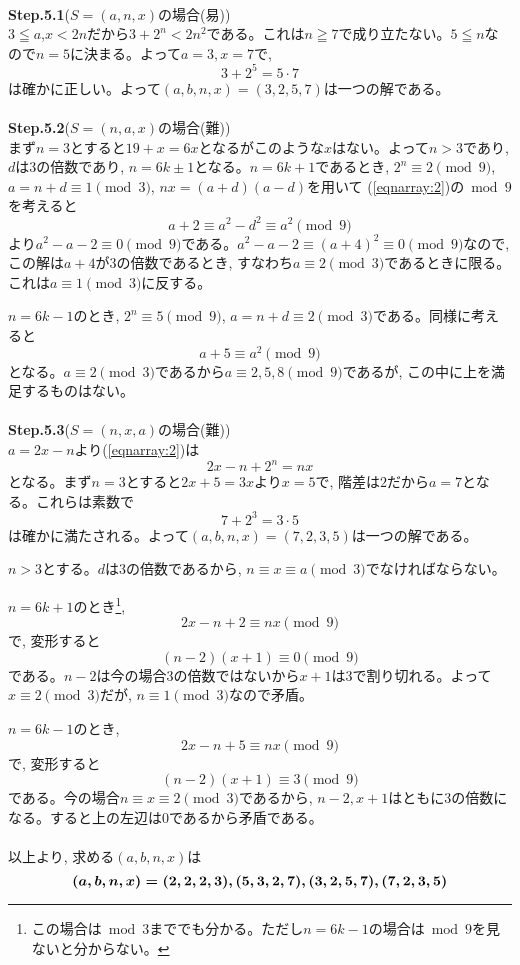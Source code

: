 \documentclass[twocolumn]{jbook}
\newcommand{\bolm}[1]{{\mbox{\boldmath $#1$}}}
\renewcommand{\leq}{\leqq}
\renewcommand{\geq}{\geqq}
\newcommand{\step}[2]{{\Large \textbf{Step.#1}}(#2)}
\begin{document}
\\
\step{5.1}{$S=(a,n,x)$の場合(易)}\\
$3\leq a$,$x<2n$だから$3+2^{n} < 2n^2$である。これは$n\geq 7$で成り立たない。$5\leq n$なので$n=5$に決まる。よって$a=3,x=7$で, 
\[3+2^{5} = 5\cdot 7\]
は確かに正しい。よって$(a,b,n,x) = (3,2,5,7)$は一つの解である。\\
\\
\step{5.2}{$S=(n,a,x)$の場合(難)}\\
まず$n=3$とすると$19+x = 6x$となるがこのような$x$はない。よって$n>3$であり, $d$は3の倍数であり, $n=6k\pm 1$となる。$n=6k+1$であるとき, $2^{n} \equiv 2\pmod{9}$, $a = n+d \equiv 1\pmod{3}$, $nx = (a+d)(a-d)$を用いて (\ref{eqnarray:2})の$\bmod{9}$を考えると
\[a+2 \equiv a^2 - d^2 \equiv a^2 \pmod{9}  \]
より$a^2 - a-2\equiv 0 \pmod{9}$である。$a^2 - a-2\equiv (a+4)^2 \equiv 0\pmod{9}$なので, この解は$a+4$が3の倍数であるとき, すなわち$a\equiv 2\pmod{3}$であるときに限る。これは$a\equiv 1\pmod{3}$に反する。\par
$n=6k-1$のとき, $2^{n} \equiv 5\pmod{9}$, $a = n+d\equiv 2\pmod{3}$である。同様に考えると
\[a+5\equiv a^2 \pmod{9}\]
となる。$a\equiv 2\pmod{3}$であるから$a\equiv 2,5,8\pmod{9}$であるが, この中に上を満足するものはない。\\
\\
\step{5.3}{$S=(n,x,a)$の場合(難)}\\
$a=2x - n$より(\ref{eqnarray:2})は
\[2x - n + 2^{n} = nx\]
となる。まず$n=3$とすると$2x + 5 = 3x$より$x=5$で, 階差は$2$だから$a=7$となる。これらは素数で
\[7 + 2^{3} = 3\cdot 5\]
は確かに満たされる。よって$(a,b,n,x) = (7,2,3,5)$は一つの解である。\par
$n>3$とする。$d$は$3$の倍数であるから, $n\equiv x \equiv a \pmod{3}$でなければならない。\par
$n=6k+1$のとき\footnote{この場合は$\bmod{3}$まででも分かる。ただし$n=6k-1$の場合は$\bmod{9}$を見ないと分からない。}, 
\[2x - n + 2 \equiv nx \pmod{9}\]
で, 変形すると
\[(n-2)(x+1)\equiv 0 \pmod{9}\]
である。$n-2$は今の場合$3$の倍数ではないから$x+1$は$3$で割り切れる。よって$x\equiv 2\pmod{3}$だが, $n\equiv 1\pmod{3}$なので矛盾。\par
$n=6k-1$のとき, 
\[2x - n + 5 \equiv nx \pmod{9}\]
で, 変形すると
\[(n-2)(x+1) \equiv 3\pmod{9}\]
である。今の場合$n\equiv x\equiv 2\pmod{3}$であるから, $n-2, x+1$はともに3の倍数になる。すると上の左辺は$0$であるから矛盾である。\\
\\
以上より, 求める$(a,b,n,x)$は
\[\bolm{(a,b,n,x) = (2,2,2,3),(5,3,2,7),(3,2,5,7),(7,2,3,5)}\]
\end{document}
